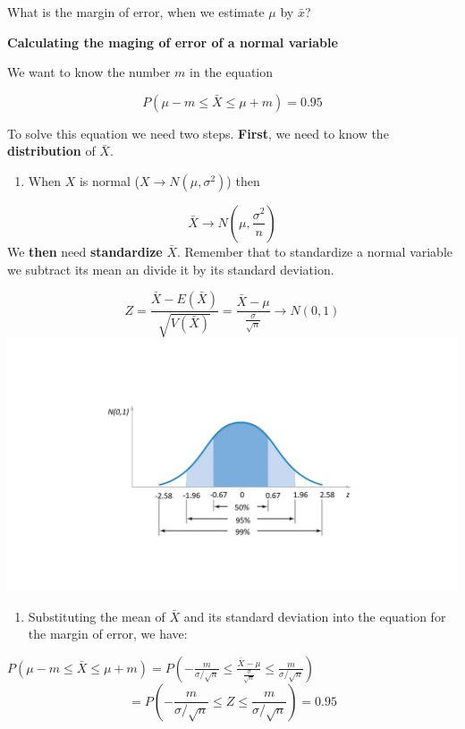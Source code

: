 \documentclass[
]{book}
\providecommand{\tightlist}{%
  \setlength{\itemsep}{0pt}\setlength{\parskip}{0pt}}
\begin{document}
What is the margin of error, when we estimate \(\mu\) by \(\bar{x}\)?

\textbf{Calculating the maging of error of a normal variable}

We want to know the number \(m\) in the equation

\[P(\mu-m \leq \bar{X} \leq\mu + m)=0.95\]

To solve this equation we need two steps. \textbf{First}, we need to know the \textbf{distribution} of \(\bar{X}\).

\begin{enumerate}
\def\labelenumi{\arabic{enumi}.}
\tightlist
\item
  When \(X\) is normal (\(X \rightarrow N(\mu, \sigma^2)\)) then
\end{enumerate}

\[\bar{X} \rightarrow N(\mu, \frac{\sigma^2}{n})\]
We \textbf{then} need \textbf{standardize} \(\bar{X}\). Remember that to standardize a normal variable we subtract its mean an divide it by its standard deviation.

\[Z=\frac{\bar{X}-E(\bar{X})}{\sqrt{V(\bar{X})}} =\frac{\bar{X}-\mu}{\frac{\sigma}{\sqrt{n}}}  \rightarrow N(0,1)\]
\includegraphics{./figures/phi.JPG}

\begin{enumerate}
\def\labelenumi{\arabic{enumi}.}
\setcounter{enumi}{1}
\tightlist
\item
  Substituting the mean of \(\bar{X}\) and its standard deviation into the equation for the margin of error, we have:
\end{enumerate}

\(P(\mu-m \leq \bar{X} \leq\mu + m)=P(-\frac{m}{\sigma/\sqrt{n}} \leq \frac{\bar{X}-\mu}{\frac{\sigma}{\sqrt{n}}}\leq\frac{m}{\sigma/\sqrt{n}})\)
\[=P(-\frac{m}{\sigma/\sqrt{n}} \leq Z \leq\frac{m}{\sigma/\sqrt{n}})=0.95\]
\end{document}

